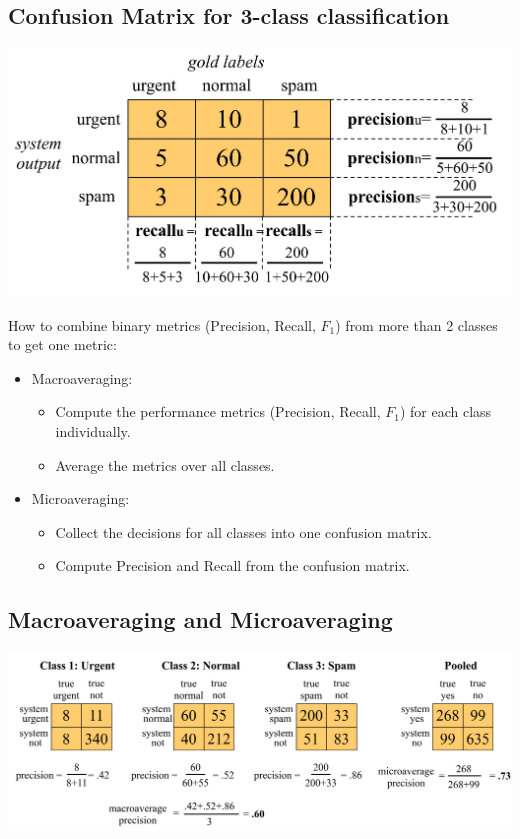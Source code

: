 \documentclass{book}
\begin{document}
\subsection{Confusion Matrix for 3-class classification}


\begin{center}
\includegraphics[scale=0.23]{pics/confmatrix.png}
\end{center}


How to combine binary metrics (Precision, Recall, $F_1$) from more than 2 classes to get one metric:
\begin{itemize}
 \item Macroaveraging:
 \begin{itemize}
    \item Compute the performance metrics (Precision, Recall, $F_1$) for each class individually.
    \item Average the metrics over all classes.
 \end{itemize}
 \item Microaveraging:
 \begin{itemize}
    \item Collect the decisions for all classes into one confusion matrix.
    \item Compute Precision and Recall from the confusion matrix.
 \end{itemize}
\end{itemize}



\subsection{Macroaveraging and Microaveraging}


\begin{center}
\includegraphics[scale=0.23]{pics/confmatrixmulti.png}
\end{center}






\end{document}
